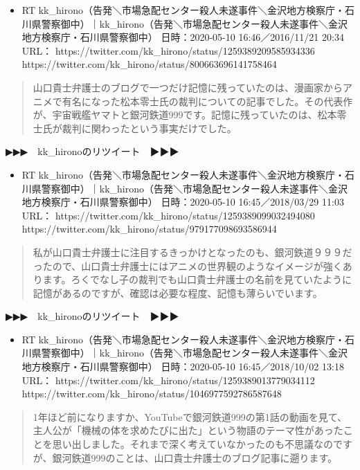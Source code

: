 \documentclass[]{ltjarticle}
\providecommand{\tightlist}{%
  \setlength{\itemsep}{0pt}\setlength{\parskip}{0pt}}
\begin{document}
\begin{itemize}
\tightlist
\item
  RT
  kk\_hirono（告発＼市場急配センター殺人未遂事件＼金沢地方検察庁・石川県警察御中）｜kk\_hirono（告発＼市場急配センター殺人未遂事件＼金沢地方検察庁・石川県警察御中）
  日時：2020-05-10 16:46／2016/11/21 20:34 URL：
  https://twitter.com/kk\_hirono/status/1259389209585934336
  https://twitter.com/kk\_hirono/status/800663696141758464
\end{itemize}

\begin{quote}
山口貴士弁護士のブログで一つだけ記憶に残っていたのは、漫画家からアニメで有名になった松本零士氏の裁判についての記事でした。その代表作が、宇宙戦艦ヤマトと銀河鉄道999です。記憶に残っていたのは、松本零士氏が裁判に関わったという事実だけでした。
\end{quote}

▶▶▶　kk\_hironoのリツイート　▶▶▶

\begin{itemize}
\tightlist
\item
  RT
  kk\_hirono（告発＼市場急配センター殺人未遂事件＼金沢地方検察庁・石川県警察御中）｜kk\_hirono（告発＼市場急配センター殺人未遂事件＼金沢地方検察庁・石川県警察御中）
  日時：2020-05-10 16:45／2018/03/29 11:03 URL：
  https://twitter.com/kk\_hirono/status/1259389099032494080
  https://twitter.com/kk\_hirono/status/979177098693586944
\end{itemize}

\begin{quote}
私が山口貴士弁護士に注目するきっかけとなったのも、銀河鉄道９９９だったので、山口貴士弁護士にはアニメの世界観のようなイメージが強くあります。ろくでなし子の裁判でも山口貴士弁護士の名前を見ていたように記憶があるのですが、確認は必要な程度、記憶も薄らいでいます。
\end{quote}

▶▶▶　kk\_hironoのリツイート　▶▶▶

\begin{itemize}
\tightlist
\item
  RT
  kk\_hirono（告発＼市場急配センター殺人未遂事件＼金沢地方検察庁・石川県警察御中）｜kk\_hirono（告発＼市場急配センター殺人未遂事件＼金沢地方検察庁・石川県警察御中）
  日時：2020-05-10 16:45／2018/10/02 13:18 URL：
  https://twitter.com/kk\_hirono/status/1259389013779034112
  https://twitter.com/kk\_hirono/status/1046977592786587648
\end{itemize}

\begin{quote}
1年ほど前になりますか、YouTubeで銀河鉄道999の第1話の動画を見て、主人公が「機械の体を求めたびに出た」という物語のテーマ性があったことを思い出しました。それまで深く考えていなかったのも不思議なのですが、銀河鉄道999のことは、山口貴士弁護士のブログ記事に遡ります。
\end{quote}
\end{document}
